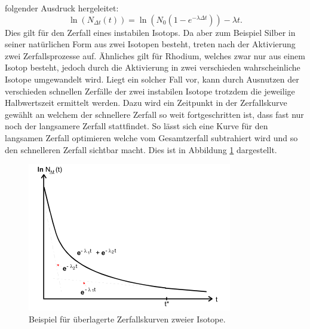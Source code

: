 folgender Ausdruck hergeleitet:
\begin{equation}
  \ln(N_{\Delta t}(t)) =\ln(N_0 (1-e^{- \lambda \Delta t})) - \lambda t  .
  \label{eqn:Zerfallskonstante}
\end{equation}
Dies gilt für den Zerfall eines instabilen Isotops. Da aber zum Beispiel Silber in seiner natürlichen Form aus zwei Isotopen besteht, treten nach der Aktivierung zwei Zerfallsprozesse
auf. Ähnliches gilt für Rhodium, welches zwar nur aus einem Isotop besteht, jedoch durch die Aktivierung in zwei verschieden wahrscheinliche Isotope umgewandelt wird.
Liegt ein solcher Fall vor, kann durch Ausnutzen der verschieden schnellen Zerfälle der zwei instabilen Isotope trotzdem die jeweilige Halbwertszeit ermittelt werden. Dazu wird ein Zeitpunkt
in der Zerfallskurve gewählt an welchem der schnellere Zerfall so weit fortgeschritten ist, dass fast nur noch der langsamere Zerfall stattfindet. So lässt sich eine Kurve für den
langsamen Zerfall optimieren welche vom Gesamtzerfall subtrahiert wird und so den schnelleren Zerfall sichtbar macht. Dies ist in Abbildung \ref{fig:2Isotope} dargestellt.
\begin{figure}
  \centering
  \includegraphics{images/2Isotope.png}
  \caption{Beispiel für überlagerte Zerfallskurven zweier Isotope.\cite{sample}}
  \label{fig:2Isotope}
\end{figure}
